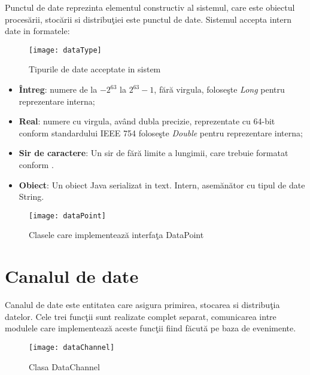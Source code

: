 Punctul de date reprezinta elementul constructiv al sistemul, care este obiectul procesării, stocării si distribuţiei este punctul de date. 
Sistemul accepta intern date in formatele: 
\begin{wrapfigure}{r}{0.38\textwidth}
	\centering
	\texttt{[image: dataType]}
	\caption{Tipurile de date acceptate in sistem}
\end{wrapfigure}
\begin{itemize}
	\item \textbf{Întreg}: numere de la $-2^{63}$ la $2^{63} -1$, fără virgula, foloseşte \textit{Long} pentru reprezentare interna;
	\item \textbf{Real}: numere cu virgula, având dubla precizie, reprezentate cu 64-bit conform standardului \autocite{4610935} IEEE 754  foloseşte \textit{Double} pentru reprezentare interna;
	\item \textbf{Sir de caractere}: Un sir de fără limite a lungimii, care trebuie formatat conform \autocite{rfc4627}. 
	\item \textbf{Obiect}: Un obiect Java serializat in text. Intern, asemănător cu tipul de date String. 
\end{itemize}

\begin{figure}[h]
	\centering
	\texttt{[image: dataPoint]}
	\caption{Clasele care implementează interfaţa DataPoint}
\end{figure}

\section{Canalul de date}

Canalul de date este entitatea care asigura primirea, stocarea si distribuţia datelor. Cele trei funcţii sunt realizate complet separat, comunicarea intre modulele care implementează aceste funcţii fiind făcută pe baza de evenimente.
\begin{figure}[h]
	\centering
	\texttt{[image: dataChannel]}
	\caption{Clasa DataChannel}
\end{figure}
